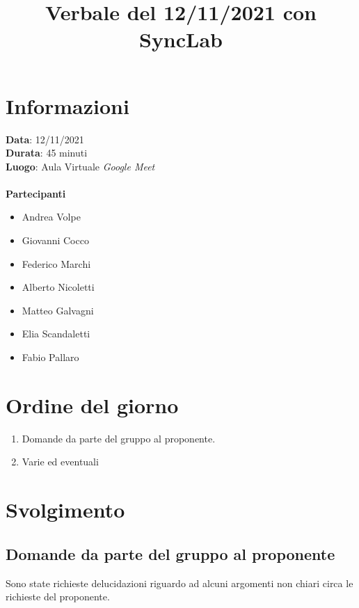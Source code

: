 \documentclass[a4paper,12pt]{article}
\author{}
\date{}
\begin{document}
\title{Verbale del 12/11/2021 con SyncLab}
\maketitle

\section{Informazioni}
\textbf{Data}: 12/11/2021\\
\textbf{Durata}: 45 minuti\\
\textbf{Luogo}: Aula Virtuale \textit{Google Meet}\\\\

\textbf{Partecipanti}
\begin{itemize}
	\item Andrea Volpe
	\item Giovanni Cocco
	\item Federico Marchi
	\item Alberto Nicoletti
	\item Matteo Galvagni
	\item Elia Scandaletti
	\item Fabio Pallaro
\end{itemize}

\section{Ordine del giorno}
\begin{enumerate}
	\item Domande da parte del gruppo al proponente.
	\item Varie ed eventuali
\end{enumerate}

\section{Svolgimento}

\subsection{Domande da parte del gruppo al proponente}
Sono state richieste delucidazioni riguardo ad alcuni argomenti non chiari circa le richieste del proponente.
\end{document}
